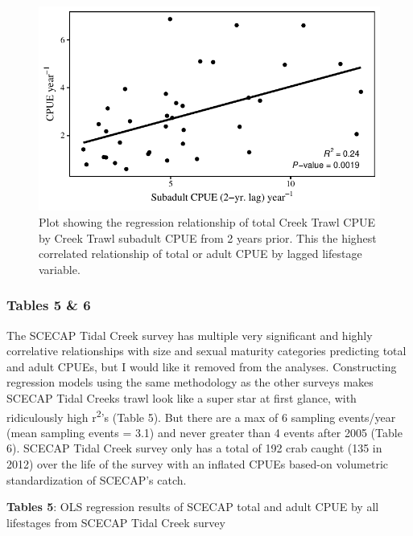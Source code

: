\documentclass[
]{article}
\begin{document}
\begin{figure}
\centering
\includegraphics{NEWCh1_Figs_files/figure-latex/Figure 3 (Sub Plot)-1.pdf}
\caption{Plot showing the regression relationship of total Creek Trawl
CPUE by Creek Trawl subadult CPUE from 2 years prior. This the highest
correlated relationship of total or adult CPUE by lagged lifestage
variable.}
\end{figure}

\newpage

\hypertarget{tables-5-6}{%
\subsubsection{Tables 5 \& 6}\label{tables-5-6}}

The SCECAP Tidal Creek survey has multiple very significant and highly
correlative relationships with size and sexual maturity categories
predicting total and adult CPUEs, but I would like it removed from the
analyses. Constructing regression models using the same methodology as
the other surveys makes SCECAP Tidal Creeks trawl look like a super star
at first glance, with ridiculously high r\textsuperscript{2}'s (Table
5). But there are a max of 6 sampling events/year (mean sampling events
= 3.1) and never greater than 4 events after 2005 (Table 6). SCECAP
Tidal Creek survey only has a total of 192 crab caught (135 in 2012)
over the life of the survey with an inflated CPUEs based-on volumetric
standardization of SCECAP's catch.

\textbf{Tables 5}: OLS regression results of SCECAP total and adult CPUE
by all lifestages from SCECAP Tidal Creek survey
\end{document}
